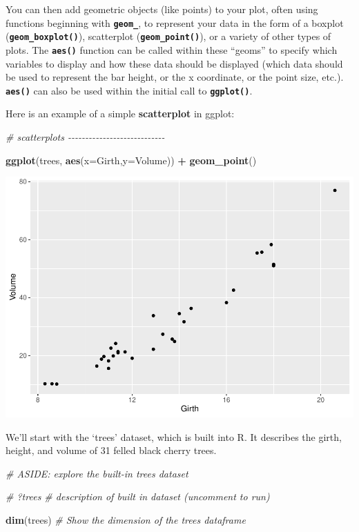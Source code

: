 \documentclass[
]{article}
\newenvironment{Shaded}{\begin{snugshade}}{\end{snugshade}}
\newcommand{\AttributeTok}[1]{\textcolor[rgb]{0.13,0.29,0.53}{#1}}
\newcommand{\CommentTok}[1]{\textcolor[rgb]{0.56,0.35,0.01}{\textit{#1}}}
\newcommand{\FunctionTok}[1]{\textcolor[rgb]{0.13,0.29,0.53}{\textbf{#1}}}
\newcommand{\NormalTok}[1]{#1}
\newcommand{\SpecialCharTok}[1]{\textcolor[rgb]{0.81,0.36,0.00}{\textbf{#1}}}
\begin{document}
You can then add geometric objects (like points) to your plot, often
using functions beginning with \textbf{\texttt{geom\_}}, to represent
your data in the form of a boxplot (\textbf{\texttt{geom\_boxplot()}}),
scatterplot (\textbf{\texttt{geom\_point()}}), or a variety of other
types of plots. The \textbf{\texttt{aes()}} function can be called
within these ``geoms'' to specify which variables to display and how
these data should be displayed (which data should be used to represent
the bar height, or the x coordinate, or the point size, etc.).
\textbf{\texttt{aes()}} can also be used within the initial call to
\textbf{\texttt{ggplot()}}.

Here is an example of a simple \textbf{scatterplot} in ggplot:

\begin{Shaded}
\begin{Highlighting}[]
\CommentTok{\# scatterplots {-}{-}{-}{-}{-}{-}{-}{-}{-}{-}{-}{-}{-}{-}{-}{-}{-}{-}{-}{-}{-}{-}{-}{-}{-}{-}{-}{-}}

\FunctionTok{ggplot}\NormalTok{(trees, }\FunctionTok{aes}\NormalTok{(}\AttributeTok{x=}\NormalTok{Girth,}\AttributeTok{y=}\NormalTok{Volume)) }\SpecialCharTok{+}
  \FunctionTok{geom\_point}\NormalTok{()}
\end{Highlighting}
\end{Shaded}

\includegraphics{module1_3_files/figure-latex/unnamed-chunk-7-1.pdf}

We'll start with the `trees' dataset, which is built into R. It
describes the girth, height, and volume of 31 felled black cherry trees.

\begin{Shaded}
\begin{Highlighting}[]
\CommentTok{\# ASIDE: explore the built{-}in \textquotesingle{}trees\textquotesingle{} dataset}

\CommentTok{\# ?trees      \# description of built in dataset  (uncomment to run)}

\FunctionTok{dim}\NormalTok{(trees)   }\CommentTok{\# Show the dimension of the trees dataframe                                              }
\end{Highlighting}
\end{Shaded}
\end{document}
